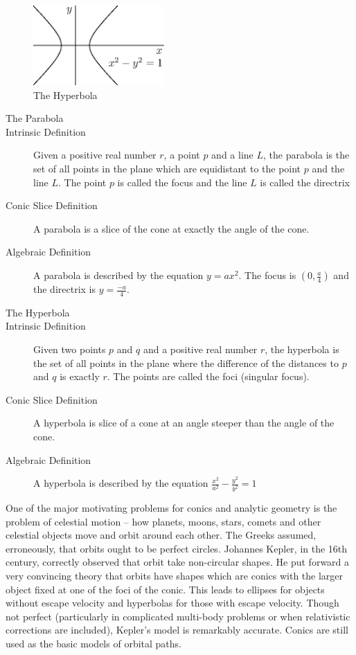 \documentclass[fleqn]{report}
\begin{document}
\begin{figure}[t]
\centering
\includegraphics[width=5cm]{figure04.eps}
\caption{The Hyperbola}
\label{figure-hyperbola}
\end{figure}

\begin{description}
\item[The Parabola]
\item[Intrinsic Definition] Given a positive real number $r$,
a point $p$ and a line $L$, the parabola is the set of all
points in the plane which are equidistant to the point $p$
and the line $L$. The point $p$ is called the focus and the
line $L$ is called the directrix
\item[Conic Slice Definition] A parabola is a slice of the cone
at exactly the angle of the cone.
\item[Algebraic Definition] A parabola is described by the
equation $y = ax^2$. The focus is $(0,\frac{a}{4})$ and the
directrix is $y=\frac{-a}{4}$. 
\end{description}

\begin{description}
\item[The Hyperbola]
\item[Intrinsic Definition] Given two points $p$ and $q$ and a
positive real number $r$, the hyperbola is the set of all points
in the plane where the difference of the distances to $p$ and $q$ is
exactly $r$. The points are called the foci (singular focus). 
\item[Conic Slice Definition] A hyperbola is slice of a cone at
an angle steeper than the angle of the cone.
\item[Algebraic Definition] A hyperbola is described by the
equation $\frac{x^2}{a^2} - \frac{y^2}{b^2} = 1$
\end{description}

One of the major motivating problems for conics and analytic
geometry is the problem of
celestial motion -- how planets, moons, stars, comets and other
celestial objects move and orbit around each other. The Greeks
assumed, erroneously, that orbits ought to be perfect circles.
Johannes Kepler, in the 16th century, correctly observed that
orbit take non-circular shapes. He put forward a very
convincing theory that orbits have shapes which are conics with
the larger object fixed at one of the foci of the conic. This
leads to ellipses for objects without escape velocity and
hyperbolas for those with escape velocity. Though not perfect
(particularly in complicated multi-body problems or when
relativistic corrections are included), Kepler's model is
remarkably accurate. Conics are still used as the basic
models of orbital paths.
\end{document}
